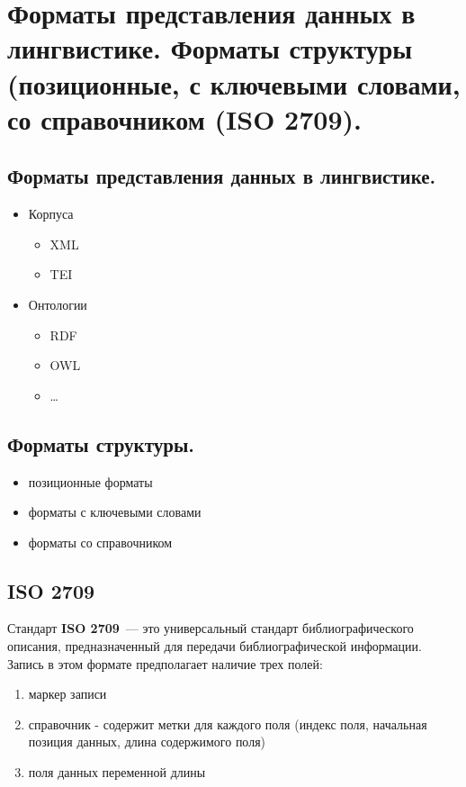 \documentclass[12pt]{article}
\theoremstyle{definition}
\theoremstyle{remark}
\numberwithin{equation}{section}
\begin{document}
\section{Форматы представления данных в лингвистике. Форматы структуры (позиционные, с ключевыми словами, со справочником (ISO 2709).}
\subsection{Форматы представления данных в лингвистике.}
\begin{itemize}
\item Корпуса
\begin{itemize}
\item XML
\item TEI
\end{itemize}
\item Онтологии
\begin{itemize}
\item RDF
\item OWL
\item \dots
\end{itemize}
\end{itemize}

\subsection{Форматы структуры.}
\begin{itemize}
\item позиционные форматы
\item форматы с ключевыми словами
\item форматы со справочником
\end{itemize}

\subsection{ISO 2709}
\label{subsec:ISO}
Стандарт \textbf{ISO 2709}~--- это универсальный стандарт библиографического описания, предназначенный для передачи библиографической информации. Запись в этом формате предполагает наличие трех полей:
\begin{enumerate}
\item маркер записи
\item справочник - содержит метки для каждого поля (индекс поля, начальная позиция данных, длина содержимого поля)
\item поля данных переменной длины
\end{enumerate}
\end{document}
